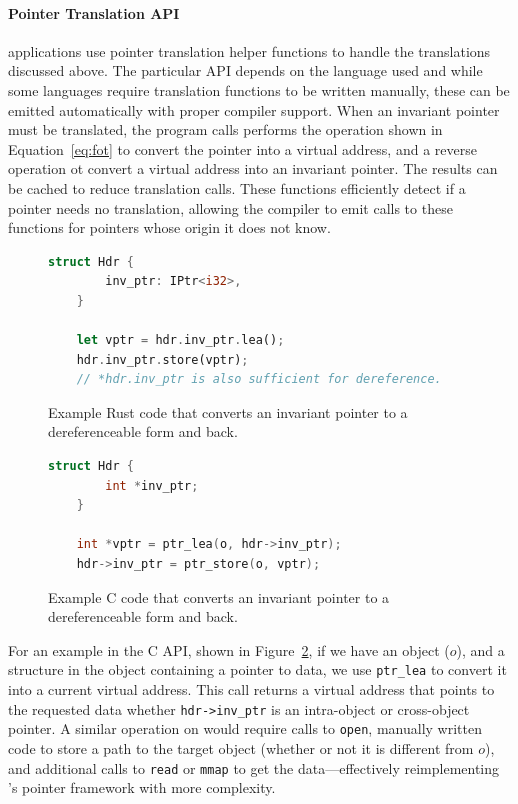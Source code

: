 \paragraph{Pointer Translation API}

\Twizzler applications use pointer translation helper functions to handle the
translations discussed above. The particular API depends on the language used and while some languages require
translation functions to be written manually, these can be emitted automatically with proper compiler support.
When an invariant pointer must be
translated, the program calls performs the operation shown in Equation~\ref{eq:fot} to convert the pointer into a
virtual address, and a reverse operation ot convert a virtual address into an invariant pointer.
The results can be cached to reduce translation calls.
These functions efficiently detect if a pointer needs no translation,
allowing the compiler to emit calls to these functions for pointers whose
origin it does not know.



\begin{figure}
    \begin{lstlisting}[language=Rust]
    struct Hdr {
        inv_ptr: IPtr<i32>,
    }

    let vptr = hdr.inv_ptr.lea();
    hdr.inv_ptr.store(vptr);
    // *hdr.inv_ptr is also sufficient for dereference.
\end{lstlisting}
    \caption[Invariant pointer Rust example]{Example Rust code that converts an invariant pointer to a dereferenceable form and back.}
    \label{fig:rustex}
\end{figure}

\begin{figure}
    \hspace*{-2.6cm}
    \begin{lstlisting}[language=C]
    struct Hdr {
        int *inv_ptr;
    }

    int *vptr = ptr_lea(o, hdr->inv_ptr);
    hdr->inv_ptr = ptr_store(o, vptr);
\end{lstlisting}
    \caption[Invariant pointer C example]{Example C code that converts an invariant pointer to a dereferenceable form and back.}
    \label{fig:cex}
\end{figure}


For an example in the C API, shown in Figure~\ref{fig:cex}, if we have
an object ($o$), and a structure in
the object containing a pointer to data,
we use
\texttt{ptr\_lea} to convert it into a current virtual address.
This call returns a virtual address that points to the requested
data whether \texttt{hdr->inv\_ptr} is an intra-object or cross-object pointer.
A similar operation on \unix would require calls to \texttt{open}, manually
written code to store a path to the target object (whether or not it is
different from $o$), and additional calls to \texttt{read} or \texttt{mmap} to
get the data---effectively reimplementing \Twizzler's pointer
framework with more complexity.

